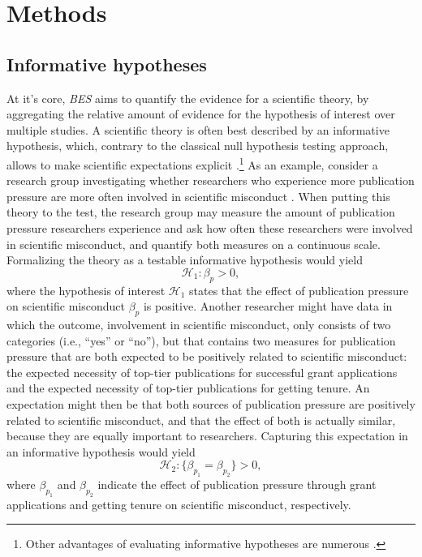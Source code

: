 \documentclass[]{interact}
\theoremstyle{plain}%
\theoremstyle{definition}
\theoremstyle{remark}
\begin{document}
\hypertarget{methods}{%
\section{Methods}\label{methods}}

\hypertarget{informative-hypotheses}{%
\subsection{Informative hypotheses}\label{informative-hypotheses}}

At it's core, \emph{BES} aims to quantify the evidence for a scientific
theory, by aggregating the relative amount of evidence for the
hypothesis of interest over multiple studies. A scientific theory is
often best described by an informative hypothesis, which, contrary to
the classical null hypothesis testing approach, allows to make
scientific expectations explicit \citep[e.g.,
see][]{hoijtink_informative_2012, vandeschoot_informative_2011}.\footnote{Other
  advantages of evaluating informative hypotheses are numerous
  \citep[e.g.,
  see][]{beland2012informative, hoijtink_klugkist_boelen_2008, klaassen_informative_2020, vandeschoot_informative_sem_2011, vandeschoot_informative_introduction_2011}.}
As an example, consider a research group investigating whether
researchers who experience more publication pressure are more often
involved in scientific misconduct
\citep[e.g.,][]{gopalakrishna_riet_vink_stoop_wicherts_bouter_2021}.
When putting this theory to the test, the research group may measure the
amount of publication pressure researchers experience and ask how often
these researchers were involved in scientific misconduct, and quantify
both measures on a continuous scale. Formalizing the theory as a
testable informative hypothesis would yield \[
\mathcal{H}_{1}: \beta_{p} > 0,
\] where the hypothesis of interest \(\mathcal{H}_1\) states that the
effect of publication pressure on scientific misconduct \(\beta_{p}\) is
positive. Another researcher might have data in which the outcome,
involvement in scientific misconduct, only consists of two categories
(i.e., ``yes'' or ``no''), but that contains two measures for
publication pressure that are both expected to be positively related to
scientific misconduct: the expected necessity of top-tier publications
for successful grant applications and the expected necessity of top-tier
publications for getting tenure. An expectation might then be that both
sources of publication pressure are positively related to scientific
misconduct, and that the effect of both is actually similar, because
they are equally important to researchers. Capturing this expectation in
an informative hypothesis would yield \[
\mathcal{H}_{2}: \{\beta_{p_1} = \beta_{p_2}\} > 0,
\] where \(\beta_{p_1}\) and \(\beta_{p_2}\) indicate the effect of
publication pressure through grant applications and getting tenure on
scientific misconduct, respectively.
\end{document}
